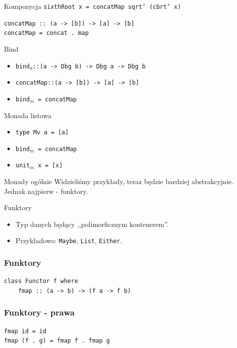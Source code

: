 \documentclass[14pt]{beamer}
\begin{document}
\begin{frame}{Kompozycja}
    \texttt{sixthRoot x = concatMap sqrt' (cbrt' x)}

    \texttt{concatMap :: (a -> [b]) -> [a] -> [b]\\
    concatMap = concat . map}
\end{frame}

\begin{frame}{Bind}
    \begin{itemize}
        \item \texttt{bind$_d$::(a -> Dbg b) -> Dbg a -> Dbg b}
        \item \texttt{concatMap::(a -> [b]) -> [a] -> [b]}
        \item \texttt{bind$_m$ = concatMap}
    \end{itemize}
\end{frame}

\begin{frame}{Monada listowa}
    \begin{itemize}
        \item \texttt{type Mv a = [a]}
        \item \texttt{bind$_m$ = concatMap}
        \item \texttt{unit$_m$ x = [x]}
    \end{itemize}
\end{frame}

\begin{frame}{Monady ogólnie}
    Widzieliśmy przykłady, teraz będzie bardziej abstrakcyjnie.
    Jednak najpierw - funktory.
\end{frame}

\begin{frame}{Funktory}
    \begin{itemize}
        \item Typ danych będący ,,polimorficznym kontenerem''.
        \item Przykładowo: \texttt{Maybe}, \texttt{List}, \texttt{Either}.
    \end{itemize}
\end{frame}

\begin{frame}[fragile]
\frametitle{Funktory}
\begin{verbatim}
class Functor f where
    fmap :: (a -> b) -> (f a -> f b)
\end{verbatim}
\end{frame}

\begin{frame}[fragile]
\frametitle{Funktory - prawa}
\begin{verbatim}
fmap id = id
fmap (f . g) = fmap f . fmap g
\end{verbatim}
\end{frame}
\end{document}
